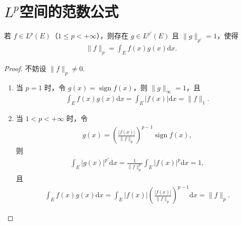 \documentclass[../../main.tex]{subfiles}%
\begin{document}
\section{$L^p$空间的范数公式}

\begin{theorem}
若 $f\in L^p(E)$（$1\leqslant p<+\infty$），则存在 $g\in L^{p'}(E)$ 且 $\|g\|_{p'}=1$，使得
\begin{align}
\|f\|_p = \int_E f(x)g(x)\mathrm{d}x. \label{eq::8u238rURU32ur8-9}
\end{align}
\end{theorem}
\begin{proof}
不妨设 $\|f\|_p \neq 0$.
\begin{enumerate}[(1)]
\item 当 $p=1$ 时，令 $g(x)=\operatorname{sign} f(x)$，则 $\|g\|_\infty=1$，且
\begin{align*}
\int_E f(x)g(x)\mathrm{d}x = \int_E |f(x)|\mathrm{d}x = \|f\|_1.
\end{align*}

\item 当 $1<p<+\infty$ 时，令
\begin{align*}
g(x) = \left( \frac{|f(x)|}{\|f\|_p} \right)^{p-1} \operatorname{sign} f(x),
\end{align*}
则
\begin{align*}
\int_E |g(x)|^{p'} \mathrm{d}x = \frac{1}{\|f\|_p^p} \int_E |f(x)|^p \mathrm{d}x = 1,
\end{align*}
且
\begin{align*}
\int_E f(x)g(x)\mathrm{d}x = \int_E |f(x)| \left( \frac{|f(x)|}{\|f\|_p} \right)^{p-1} \mathrm{d}x = \|f\|_p.
\end{align*}
\end{enumerate}
\end{proof}
\end{document}
